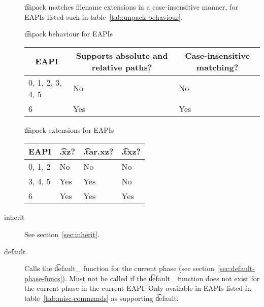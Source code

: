\begin{description}
     \t{unpack} matches filename extensions in a case-insensitive
    manner, for EAPIs listed such in table~\ref{tab:unpack-behaviour}.

    \begin{centertable}{\t{unpack} behaviour for EAPIs}
        \label{tab:unpack-behaviour}
        \begin{tabular}{lll}
          \toprule
          \multicolumn{1}{c}{\textbf{EAPI}} &
          \multicolumn{1}{c}{\textbf{Supports absolute and relative paths?}} &
          \multicolumn{1}{c}{\textbf{Case-insensitive matching?}} \\
          \midrule
          0, 1, 2, 3, 4, 5  & No  & No  \\
          6                 & Yes & Yes \\
          \bottomrule
        \end{tabular}
    \end{centertable}

    \begin{centertable}{\t{unpack} extensions for EAPIs}
        \label{tab:unpack-extensions-table}
        \begin{tabular}{llll}
          \toprule
          \multicolumn{1}{c}{\textbf{EAPI}} &
          \multicolumn{1}{c}{\textbf{\t{.xz}?}} &
          \multicolumn{1}{c}{\textbf{\t{.tar.xz}?}} &
          \multicolumn{1}{c}{\textbf{\t{.txz}?}} \\
          \midrule
          0, 1, 2           & No  & No  & No  \\
          3, 4, 5           & Yes & Yes & No  \\
          6                 & Yes & Yes & Yes \\
          \bottomrule
        \end{tabular}
    \end{centertable}

\item[inherit] See section~\ref{sec:inherit}.

\item[default]
     Calls the \t{default_} function for the current phase (see
    section~\ref{sec:default-phase-funcs}). Must not be called if the \t{default_} function does
    not exist for the current phase in the current EAPI\@. Only available in EAPIs listed in
    table~\ref{tab:misc-commands} as supporting \t{default}.


\end{description}
